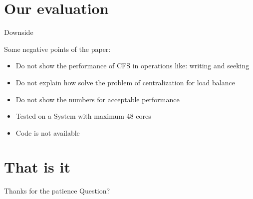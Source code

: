 \documentclass{beamer}
\begin{document}
\section{Our evaluation}

	\begin{frame}{Downside}

	Some negative points of the paper:
	\begin{itemize}
	\item Do not show the performance of CFS in operations like: writing and seeking
	\item Do not explain how solve the problem of centralization for load balance
	\item Do not show the numbers for acceptable performance
	\item Tested on a System with maximum 48 cores
	\item Code is not available
	\end{itemize}

	\end{frame}

\section{That is it}

	\begin{frame}{}

	\begin{alertblock}{Thanks for the patience}
	Question?
	\end{alertblock}

	\end{frame}
\end{document}
